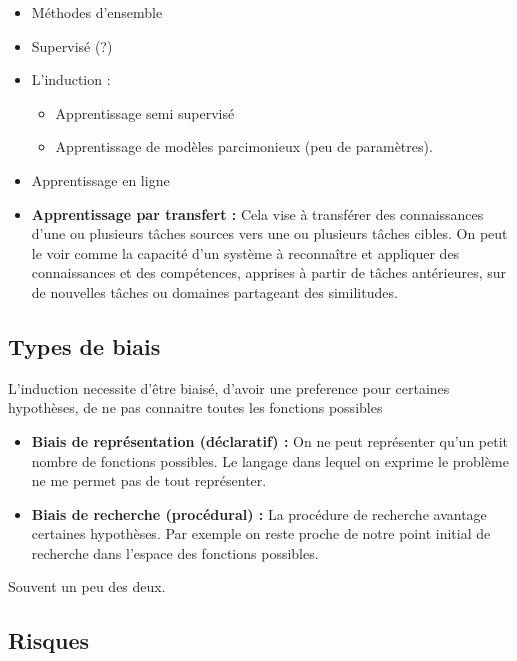 \documentclass{article}
\begin{document}
\begin{itemize}

\item Méthodes d'ensemble

\item Supervisé (?)

\item L'induction :
    \begin{itemize}
    \item Apprentissage semi supervisé 
    \item Apprentissage de modèles parcimonieux (peu de paramètres).
    \end{itemize}

\item Apprentissage en ligne

\item \textbf{Apprentissage par transfert :} Cela vise à transférer des connaissances d'une ou plusieurs tâches sources vers une ou plusieurs tâches cibles. On peut le voir comme la capacité d’un système à reconnaître et appliquer des connaissances et des compétences, apprises à partir de tâches antérieures, sur de nouvelles tâches ou domaines partageant des similitudes.

\end{itemize}

\subsection{Types de biais}

L'induction necessite d'être biaisé, d'avoir une preference pour certaines hypothèses, de ne pas connaitre toutes les fonctions possibles

\begin{itemize}
\item \textbf{Biais de représentation (déclaratif) :} On ne peut représenter qu'un petit nombre de fonctions possibles. Le langage dans lequel on exprime le problème ne me permet pas de tout représenter.
\item \textbf{Biais de recherche (procédural) :} La procédure de recherche avantage certaines hypothèses. Par exemple on reste proche de notre point initial de recherche dans l'espace des fonctions possibles.
\end{itemize}

Souvent un peu des deux.

\subsection{Risques}
\end{document}
